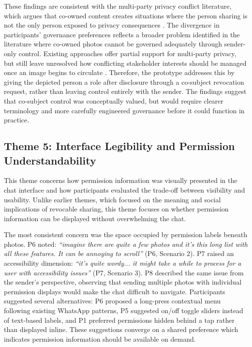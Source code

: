 These findings are consistent with the multi-party privacy conflict literature, which argues that co-owned content creates situations where the person sharing is not the only person exposed to privacy consequences \cite{cherubini_2021}. The divergence in participants’ governance preferences reflects a broader problem identified in the literature where co-owned photos cannot be governed adequately through sender-only control. Existing approaches offer partial support for multi-party privacy, but still leave unresolved how conflicting stakeholder interests should be managed once an image begins to circulate \cite{cherubini_2021, xu_my_2017, zhang_go-sharing_2023}. Therefore, the prototype addresses this by giving the depicted person a role after disclosure through a co-subject revocation request, rather than leaving control entirely with the sender. The findings suggest that co-subject control was conceptually valued, but would require clearer terminology and more carefully engineered governance before it could function in practice.


\subsection{Theme 5: Interface Legibility and Permission Understandability}
This theme concerns how permission information was visually presented in the chat interface and how participants evaluated the trade-off between visibility and usability. Unlike earlier themes, which focused on the meaning and social implications of revocable sharing, this theme focuses on whether permission information can be displayed without overwhelming the chat.

The most consistent concern was the space occupied by permission labels beneath photos. P6 noted: \textit{``imagine there are quite a few photos and it's this long list with all these features. It can be annoying to scroll''} (P6, Scenario 2). P7 raised an accessibility dimension: \textit{``it's quite wordy... it might take a while to process for a user with accessibility issues''} (P7, Scenario 3). P8 described the same issue from the sender's perspective, observing that sending multiple photos with individual permission displays would make the chat difficult to navigate. Participants suggested several alternatives: P6 proposed a long-press contextual menu following existing WhatsApp patterns, P5 suggested on/off toggle sliders instead of text-based labels, and P1 preferred permissions hidden behind a tap rather than displayed inline. These suggestions converge on a shared preference which indicates permission information should be available on demand.

